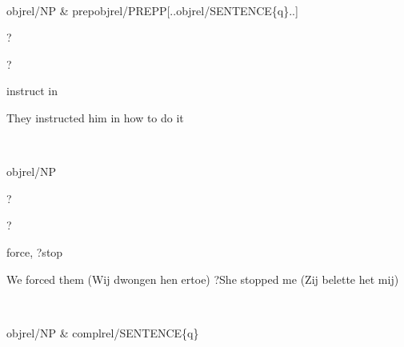 \newpage
{}
\begin{vpattern}
 \norule
\csritem \mbox{}\\
     \begin{csr}
       objrel/NP & prepobjrel/PREPP[..objrel/SENTENCE\{q\}..]
     \end{csr}
\remarksitem
\end{vpattern}


\begin{thetadescr}
\evitem ?
\esitem
     \begin{examples}
        \example  ?
     \end{examples}
\end{thetadescr}



\begin{thetadescr}
\evitem  instruct in
\esitem
     \begin{examples}
        \example They instructed him in how to do it
     \end{examples}
\end{thetadescr}


\newpage
{}
\begin{vpattern}
 \norule
\csritem \mbox{}\\
     \begin{csr}
       objrel/NP 
     \end{csr}
\remarksitem
\end{vpattern}


\begin{thetadescr}
\evitem ?
\esitem
     \begin{examples}
        \example  ?
     \end{examples}
\end{thetadescr}



\begin{thetadescr}
\evitem  force, ?stop
\esitem
     \begin{examples}
        \example We forced them (Wij dwongen hen ertoe)
        \example ?She stopped me (Zij belette het mij)
     \end{examples}
\end{thetadescr}


\newpage
{}
\begin{vpattern}
 \norule
\csritem \mbox{}\\
     \begin{csr}
       objrel/NP & complrel/SENTENCE\{q\} 
     \end{csr}
\remarksitem
\end{vpattern}

